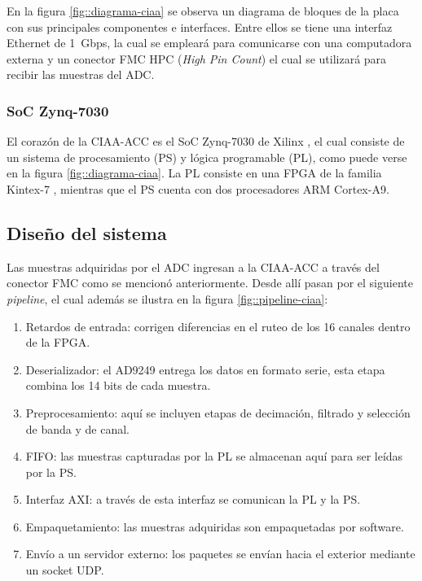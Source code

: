 \documentclass[../../main.tex]{subfiles}
\begin{document}
En la figura \ref{fig::diagrama-ciaa} se observa un diagrama de bloques de la placa con sus principales componentes e interfaces. Entre ellos se tiene una interfaz Ethernet de 1~Gbps, la cual se empleará para comunicarse con una computadora externa y un conector FMC HPC (\textit{High Pin Count}) el cual se utilizará para recibir las muestras del ADC.

\subsubsection{SoC Zynq-7030}
El corazón  de la CIAA-ACC es el SoC Zynq-7030 de Xilinx \cite{SoC}, el cual consiste de un sistema de procesamiento (PS) y lógica programable (PL), como puede verse en la figura \ref{fig::diagrama-ciaa}. La PL consiste en una FPGA de la familia Kintex-7 \cite{Kintex-7}, mientras que el PS cuenta con dos procesadores ARM Cortex-A9.



\subsection{Diseño del sistema}
Las muestras adquiridas por el ADC ingresan a la CIAA-ACC a través del conector FMC como se mencionó anteriormente. Desde allí pasan por el siguiente \textit{pipeline}, el cual además se ilustra en la figura \ref{fig::pipeline-ciaa}:

\begin{enumerate}
    \item Retardos de entrada: corrigen diferencias en el ruteo de los 16 canales dentro de la FPGA.
    \item Deserializador: el AD9249 entrega los datos en formato serie, esta etapa combina los 14 bits de cada muestra.
    \item Preprocesamiento: aquí se incluyen etapas de decimación, filtrado y selección de banda y de canal. 
    \item FIFO: las muestras capturadas por la PL se almacenan aquí para ser leídas por la PS.
    \item Interfaz AXI: a través de esta interfaz se comunican la PL y la PS.
    \item Empaquetamiento: las muestras adquiridas son empaquetadas por software.
    \item Envío a un servidor externo: los paquetes se envían hacia el exterior mediante un socket UDP.
\end{enumerate}
\end{document}
